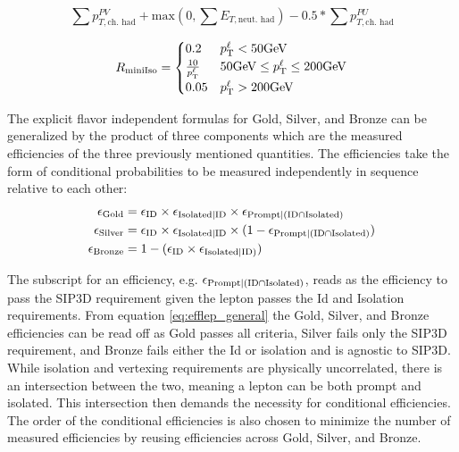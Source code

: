 \begin{equation}\label{pfiso}
\sum p_{T,\text{ch. had} }^{PV} + \text{max}(0, \sum E_{T,\text{neut. had}}) - 0.5*\sum p_{T, \text{ch. had}}^{PU}
\end{equation}

\begin{equation}
R_{\text{miniIso}}=
    \begin{cases}
      0.2 & p_{\mathrm{T}}^\ell < 50 \text{GeV}\\
      \frac{10}{p_{\mathrm{T}}^\ell} & 50 \text{GeV} \leq p_{\mathrm{T}}^\ell \leq 200 \text{GeV} \\
      0.05 & p_{\mathrm{T}}^\ell > 200 \text{GeV}
    \end{cases}
    \label{isoeq}
\end{equation}




The explicit flavor independent formulas for Gold, Silver, and Bronze can be generalized by the product of three components which are the measured efficiencies of the three previously mentioned quantities. The efficiencies take the form of conditional probabilities to be measured independently in sequence relative to each other:
\begin{equation}\label{eq:efflep_general}
\begin{split}
\epsilon_{\text{Gold}}& = \epsilon_{\text{ID}}\times \epsilon_{\text{Isolated}|\text{ID}} \times \epsilon_{\text{Prompt}|(\text{ID} \cap \text{Isolated})} \\
\epsilon_{\text{Silver}}& = \epsilon_{\text{ID}} \times \epsilon_{\text{Isolated}|\text{ID}} \times (1-\epsilon_{\text{Prompt}|(\text{ID} \cap \text{Isolated})}) \\
\epsilon_{\text{Bronze}}& = 1-(\epsilon_{\text{ID}} \times \epsilon_{\text{Isolated}|\text{ID})} )
\end{split}
\end{equation}

The subscript for an efficiency, e.g. $\epsilon_{\text{Prompt}|(\text{ID} \cap \text{Isolated})}$, reads as the efficiency to pass the SIP3D requirement given the lepton passes the Id and Isolation requirements. From equation \ref{eq:efflep_general} the Gold, Silver, and Bronze efficiencies can be read off as Gold passes all criteria, Silver fails only the SIP3D requirement, and Bronze fails either the Id or isolation and is agnostic to SIP3D. While isolation and vertexing requirements are physically uncorrelated, there is an intersection between the two, meaning a lepton can be both prompt and isolated. This intersection then demands the necessity for conditional efficiencies.  The order of the conditional efficiencies is also chosen to minimize the number of measured efficiencies by reusing efficiencies across Gold, Silver, and Bronze.  





